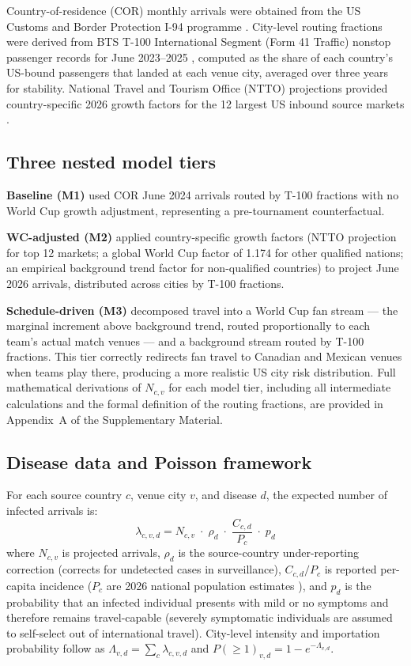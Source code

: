 \documentclass[12pt, a4paper]{article}
\begin{document}
Country-of-residence (COR) monthly arrivals were obtained from the
US Customs and Border Protection I-94 programme \citep{CBP_I94}.
City-level routing fractions were derived from BTS T-100 International
Segment (Form 41 Traffic) nonstop passenger records for June
2023--2025 \citep{BTS_T100}, computed as the share of each country's
US-bound passengers that landed at each venue city, averaged over
three years for stability. National Travel and Tourism Office (NTTO)
projections provided country-specific 2026 growth factors for the
12 largest US inbound source markets \citep{NTTO2025}.

\subsection{Three nested model tiers}

\textbf{Baseline (M1)} used COR June 2024 arrivals routed by T-100
fractions with no World Cup growth adjustment, representing a
pre-tournament counterfactual.

\textbf{WC-adjusted (M2)} applied country-specific growth factors
(NTTO projection for top 12 markets; a global World Cup factor of
1.174 for other qualified nations; an empirical background trend
factor for non-qualified countries) to project June 2026 arrivals,
distributed across cities by T-100 fractions.

\textbf{Schedule-driven (M3)} decomposed travel into a World Cup fan
stream --- the marginal increment above background trend, routed
proportionally to each team's actual match venues --- and a
background stream routed by T-100 fractions. This tier correctly
redirects fan travel to Canadian and Mexican venues when teams play
there, producing a more realistic US city risk distribution.
Full mathematical derivations of $N_{c,v}$ for each model tier,
including all intermediate calculations and the formal definition
of the routing fractions, are provided in Appendix~A of the
Supplementary Material.

\subsection{Disease data and Poisson framework}

For each source country $c$, venue city $v$, and disease $d$, the
expected number of infected arrivals is:
\[
  \lambda_{c,v,d}
    = N_{c,v} \;\cdot\; \rho_d \;\cdot\; \frac{C_{c,d}}{P_c}
               \;\cdot\; p_d
\]
where $N_{c,v}$ is projected arrivals, $\rho_d$ is the source-country
under-reporting correction (corrects for undetected cases in surveillance),
$C_{c,d}/P_c$ is reported per-capita incidence ($P_c$ are 2026
national population estimates \citep{WorldBank2024pop}), and $p_d$ is the
probability that an infected individual presents with mild or no
symptoms and therefore remains travel-capable (severely symptomatic
individuals are assumed to self-select out of international travel). City-level intensity
and importation probability follow as
$\Lambda_{v,d} = \sum_c \lambda_{c,v,d}$ and
$P(\geq 1)_{v,d} = 1 - e^{-\Lambda_{v,d}}$.
\end{document}
